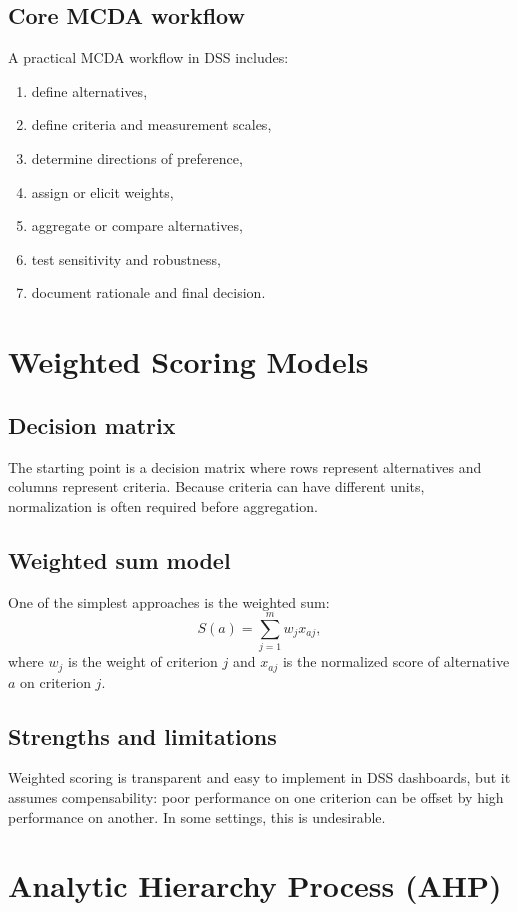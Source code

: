 \subsection{Core MCDA workflow}
A practical MCDA workflow in DSS includes:
\begin{enumerate}[label=\arabic*.]
  \item define alternatives,
  \item define criteria and measurement scales,
  \item determine directions of preference,
  \item assign or elicit weights,
  \item aggregate or compare alternatives,
  \item test sensitivity and robustness,
  \item document rationale and final decision.
\end{enumerate}

\section{Weighted Scoring Models}

\subsection{Decision matrix}
The starting point is a decision matrix where rows represent alternatives and
columns represent criteria. Because criteria can have different units,
normalization is often required before aggregation.

\subsection{Weighted sum model}
One of the simplest approaches is the weighted sum:
$$
S(a) = \sum_{j=1}^{m} w_j x_{aj},
$$
where $w_j$ is the weight of criterion $j$ and $x_{aj}$ is the normalized score
of alternative $a$ on criterion $j$.

\subsection{Strengths and limitations}
Weighted scoring is transparent and easy to implement in DSS dashboards, but it
assumes compensability: poor performance on one criterion can be offset by high
performance on another. In some settings, this is undesirable.

\section{Analytic Hierarchy Process (AHP)}

